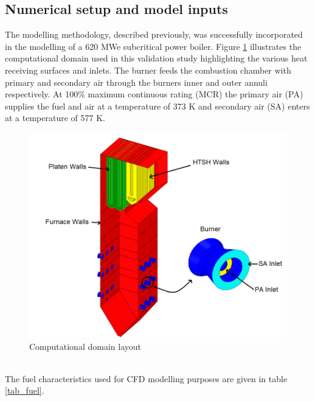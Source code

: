 \documentclass{webofc}
\begin{document}
\subsection{Numerical setup and model inputs} \label{Setup}
The modelling methodology, described previously, was successfully incorporated in the modelling of a 620 MWe subcritical power boiler. Figure \ref{comp_dom} illustrates the computational domain used in this validation study highlighting the various heat receiving surfaces and inlets. The burner feeds the combustion chamber with primary and secondary air through the burners inner and outer annuli respectively. At 100\% maximum continuous rating (MCR) the primary air (PA) supplies the fuel and air at a temperature of 373 K and secondary air (SA) enters at a temperature of 577 K.\\
\begin{figure}[h!]
\centering
\includegraphics[scale=0.375]{domain}
\setlength{\belowcaptionskip}{0pt}
\caption{Computational domain layout}
\label{comp_dom}
\end{figure} \\
The fuel characteristics used for CFD modelling purposes are given in table \ref{tab_fuel}.
\end{document}
